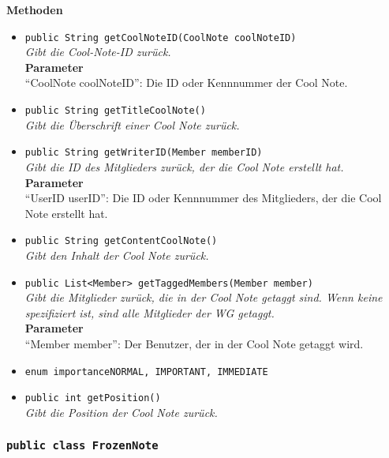 	\textbf{Methoden}
	\begin{itemize}
		\item\texttt{{public String getCoolNoteID(CoolNote coolNoteID)}}\\
		\textit{Gibt die Cool-Note-ID zurück.}\\
		\textbf{Parameter}\\
		“CoolNote coolNoteID”: Die ID oder Kennnummer der Cool Note.\\
		\item\texttt{{public String getTitleCoolNote()}}\\
		\textit{Gibt die Überschrift einer Cool Note zurück.}\\
		\item\texttt{{public String getWriterID(Member memberID)}}\\
		\textit{Gibt die ID des Mitglieders zurück, der die Cool Note erstellt hat.}\\
		\textbf{Parameter}\\
		“UserID userID”: Die ID oder Kennnummer des Mitglieders, der die Cool Note erstellt hat.\\
		
		\item\texttt{{public String getContentCoolNote()}}\\
		\textit{Gibt den Inhalt der Cool Note zurück.}\\
		\item\texttt{{public List<Member> getTaggedMembers(Member member)}}\\
		\textit{Gibt die Mitglieder zurück, die in der Cool Note getaggt sind. Wenn keine spezifiziert ist, sind alle Mitglieder der WG getaggt.}\\
		\textbf{Parameter}\\
		“Member member”: Der Benutzer, der in der Cool Note getaggt wird.\\
		\item\texttt{{enum importance{NORMAL, IMPORTANT, IMMEDIATE}}}\\
		\item\texttt{{public int getPosition()}}\\
		\textit{Gibt die Position der Cool Note zurück.}\\
	\end{itemize}

\subsubsection{\texttt{public class FrozenNote}}

